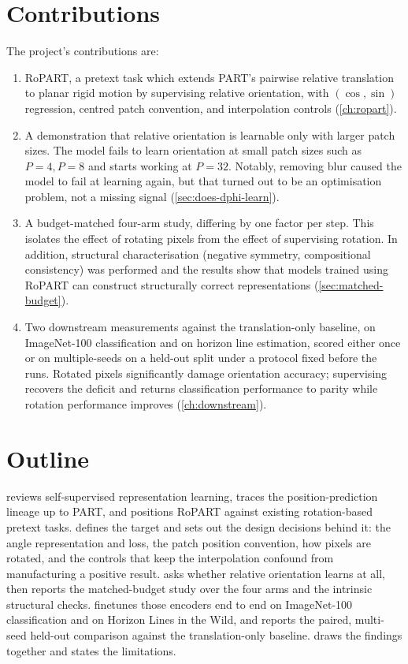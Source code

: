 \documentclass[final_report.tex]{subfiles}
\begin{document}
\section{Contributions}\label{sec:contributions}
The project's contributions are:
\begin{enumerate}
\item RoPART, a pretext task which extends PART's pairwise relative translation to planar rigid motion by supervising relative orientation, with $(\cos,\sin)$ regression, centred patch convention, and interpolation controls (\cref{ch:ropart}).
\item A demonstration that relative orientation is learnable only with larger patch sizes. The model fails to learn orientation at small patch sizes such as $P=4,P=8$ and starts working at $P=32$. Notably, removing blur caused the model to fail at learning again, but that turned out to be an optimisation problem, not a missing signal (\cref{sec:does-dphi-learn}).
\item A budget-matched four-arm study, differing by one factor per step. This isolates the effect of rotating pixels from the effect of supervising rotation. In addition, structural characterisation (negative symmetry, compositional consistency) was performed and the results show that models trained using RoPART can construct structurally correct representations (\cref{sec:matched-budget}). 
\item Two downstream measurements against the translation-only baseline, on ImageNet-100 classification and on horizon line estimation, scored either once or on multiple-seeds on a held-out split under a protocol fixed before the runs. Rotated pixels significantly damage orientation accuracy; supervising \dphi{} recovers the deficit and returns classification performance to parity while rotation performance improves (\cref{ch:downstream}).
\end{enumerate}


\section{Outline}\label{sec:outline}

 reviews self-supervised representation learning, traces the
position-prediction lineage up to PART, and positions RoPART against existing
rotation-based pretext tasks.  defines the \SEtwo{} target and
sets out the design decisions behind it: the angle representation and loss, the
patch position convention, how pixels are rotated, and the controls that keep the
interpolation confound from manufacturing a positive result. 
asks whether relative orientation learns at all, then reports the matched-budget
study over the four arms and the intrinsic structural checks.
 finetunes those encoders end to end on ImageNet-100
classification and on Horizon Lines in the Wild, and reports the paired, multi-seed held-out
comparison against the translation-only baseline.  draws the
findings together and states the limitations.

\ifSubfilesClassLoaded{\pagebreak\printbibliography}{}
\end{document}
